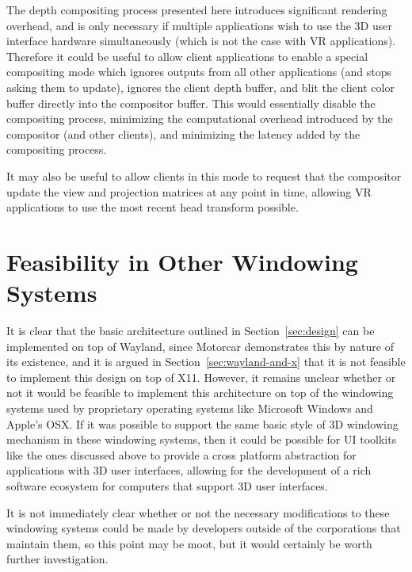 The depth compositing process presented here introduces significant rendering overhead, and is only necessary if multiple applications wish to use the 3D user interface hardware simultaneously (which is not the case with VR applications). Therefore it could be useful to allow client applications to enable a special compositing mode which ignores outputs from all other applications (and stops asking them to update), ignores the client depth buffer, and blit the client color buffer directly into the compositor buffer. This would essentially disable the compositing process, minimizing the computational overhead introduced by the compositor (and other clients), and minimizing the latency added by the compositing process.

It may also be useful to allow clients in this mode to request that the compositor update the view and projection matrices at any point in time, allowing VR applications to use the most recent head transform possible. 


\section{Feasibility in Other Windowing Systems}
It is clear that the basic architecture outlined in Section~\ref{sec:design} can be implemented on top of Wayland, since Motorcar demonstrates this by nature of its existence, and it is argued in Section~\ref{sec:wayland-and-x} that it is not feasible to implement this design on top of X11. However, it remains unclear whether or not it would be feasible to implement this architecture on top of the windowing systems used by proprietary operating systems like Microsoft Windows and Apple's OSX. If it was possible to support the same basic style of 3D windowing mechanism in these windowing systems, then it could be possible for UI toolkits like the ones discussed above to provide a cross platform abstraction for applications with 3D user interfaces, allowing for the development of a rich software ecosystem for computers that support 3D user interfaces. 

It is not immediately clear whether or not the necessary modifications to these windowing systems could be made by developers outside of the corporations that maintain them, so this point may be moot, but it would certainly be worth further investigation.

